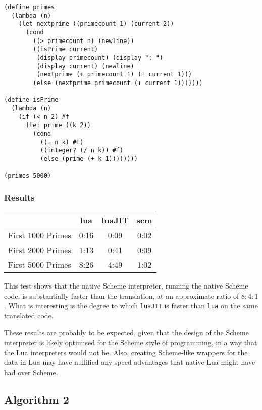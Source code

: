 \begin{framed}
\begin{verbatim}
(define primes
  (lambda (n)
    (let nextprime ((primecount 1) (current 2))
      (cond
        ((> primecount n) (newline))
        ((isPrime current)
         (display primecount) (display ": ")
         (display current) (newline)
         (nextprime (+ primecount 1) (+ current 1)))
        (else (nextprime primecount (+ current 1)))))))

(define isPrime
  (lambda (n)
    (if (< n 2) #f
      (let prime ((k 2))
        (cond
          ((= n k) #t)
          ((integer? (/ n k)) #f)
          (else (prime (+ k 1))))))))

(primes 5000)
\end{verbatim}
\end{framed}

\subsubsection{Results}

\begin{center}
\begin{tabular}{|l|c|c|c|}
\hline
& lua & luaJIT & scm \\
\hline
First 1000 Primes & 0:16 & 0:09 & 0:02 \\ \hline
First 2000 Primes & 1:13 & 0:41 & 0:09 \\ \hline
First 5000 Primes & 8:26 & 4:49 & 1:02 \\ \hline
\end{tabular}
\end{center}
This test shows that the native Scheme interpreter, running the native Scheme
code, is substantially faster than the translation, at an approximate ratio of
$8:4:1$. What is interesting is the degree to which \texttt{luaJIT} is faster
than \texttt{lua} on the same translated code.

These results are probably to be expected, given that the design of the Scheme
interpreter is likely optimised for the Scheme style of programming, in a way
that the Lua interpreters would not be. Also, creating Scheme-like wrappers for
the data in Lua may have nullified any speed advantages that native Lua might
have had over Scheme.

\subsection{Algorithm 2}

